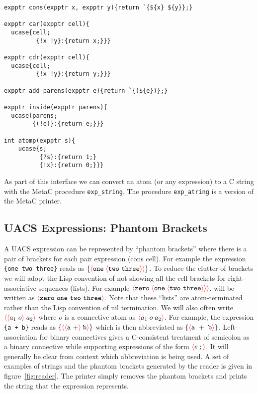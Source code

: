\documentclass{article}
\newcommand{\mtt}[1]{\mbox{\tt #1}}
\newcommand{\fopen}{{\color{red} \langle}}
\newcommand{\fclose}{{\color{red} \rangle}}
\begin{document}
\begin{verbatim}
expptr cons(expptr x, expptr y){return `{${x} ${y}};}

expptr car(expptr cell){
  ucase{cell;
         {!x !y}:{return x;}}}

expptr cdr(expptr cell){
  ucase{cell;
         {!x !y}:{return y;}}}

expptr add_parens(expptr e){return `{(${e})};}

expptr inside(expptr parens){
  ucase(parens;
        {(!e)}:{return e;}}}

int atomp(expptr s){
    ucase{s;
          {?s}:{return 1;}
          {!x}:{return 0;}}}
\end{verbatim}

As part of this interface we can convert an atom (or any expression) to a C string with the MetaC procedure {\tt exp\_string}.
The procedure {\tt exp\_atring} is a version of the MetaC printer.

\subsection{UACS Expressions: Phantom Brackets}

A UACS expression can be represented by ``phantom brackets'' where there is a pair of brackets for each pair expression (cons cell).
For example the expression \mtt{\{one two three\}} reads as $\{\fopen \mathtt{one}\;\fopen \mathtt{two~three}\fclose \fclose\}$.
To reduce the clutter of brackets we will adopt the Lisp convention of not showing all the cell brackets for right-associative sequences (lists).
For example $\fopen \mathtt{zero}\;\fopen \mathtt{one}\;\fopen \mathtt{two~three}\fclose \fclose \fclose$.
will be written as $\fopen\mathtt{zero~one~two~three}\fclose$.  Note that these ``lists'' are atom-terminated rather than the Lisp convention of
nil termination. We will also often write $\fopen \fopen a_1 \;o\fclose\;a_2\fclose$ where $o$ is a connective atom
as $\fopen a_1\;o\;a_2 \fclose$.  For example, the expression \mtt{\{a + b\}} reads as
$\{\fopen \fopen \mathtt{a~+} \fclose \;\mathtt{b} \fclose \}$ which is then abbreviated as
$\{\fopen \mathtt{a~+~b} \fclose \}$.  Left-association for binary connectives gives a
C-consistent treatment of semicolon as a binary connective while supporting expressions of the form $\fopen e \;;\fclose$.
It will generally be clear from context which abbreviation is being used.
A set of examples of strings and the phantom brackets generated by the reader is given in figure~\ref{fig:reader}.
The printer simply removes the phantom brackets and prints the string that the expression represents.
\end{document}

